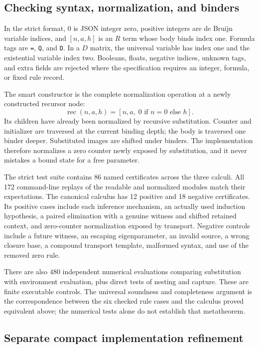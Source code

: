 \subsection{Checking syntax, normalization, and binders}

In the strict format, $0$ is JSON integer zero, positive integers are
de Bruijn variable indices, and $[n,a,h]$ is an $R$ term whose body binds
index one. Formula tags are \texttt{=}, \texttt{Q}, and \texttt{D}. In a
$D$ matrix, the universal variable has index one and the existential
variable index two. Booleans, floats, negative indices, unknown tags, and
extra fields are rejected where the specification requires an integer,
formula, or fixed rule record.

The smart constructor is the complete normalization operation at a newly
constructed recursor node:
\[
 \operatorname{rec}(n,a,h)=[n,a,\;0\text{ if }n=0\text{ else }h].
\]
Its children have already been normalized by recursive substitution.
Counter and initializer are traversed at the current binding depth; the body
is traversed one binder deeper. Substituted images are shifted under binders.
The implementation therefore normalizes a zero counter newly exposed by
substitution, and it never mistakes a bound state for a free parameter.

The strict test suite contains 86 named certificates across the three
calculi. All 172 command-line replays of the readable and normalized modules
match their expectations. The canonical calculus has 12 positive and 18
negative certificates. Its positive cases include each inference mechanism,
an actually used induction hypothesis, a paired elimination with a genuine
witness and shifted retained context, and zero-counter normalization exposed
by transport. Negative controls include a future witness, an escaping
eigenparameter, an invalid source, a wrong closure base, a compound transport
template, malformed syntax, and use of the removed zero rule.

There are also 480 independent numerical evaluations comparing substitution
with environment evaluation, plus direct tests of nesting and capture.
These are finite executable controls. The universal soundness and
completeness argument is the correspondence between the six checked rule
cases and the calculus proved equivalent above; the numerical tests alone
do not establish that metatheorem.

\subsection{Separate compact implementation refinement}
\label{sec:compact-refinement}

